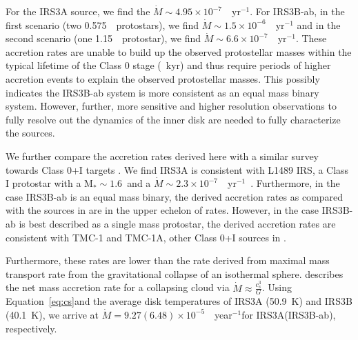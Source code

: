 \documentclass[twocolumn, 12pt, trackchanges]{aastex63}
\begin{document}
For the IRS3A source, we find the $\dot{M}\sim4.95\times10^{-7}$~\solm~yr$^{-1}$. For IRS3B-ab, in the first scenario (two 0.575~\solm~protostars), we find $\dot{M}\sim1.5\times10^{-6}$~\solm~yr$^{-1}$ and in the second scenario (one 1.15~\solm~protostar), we find $\dot{M}\sim6.6\times10^{-7}$~\solm~yr$^{-1}$. These accretion rates are unable to build up the observed protostellar masses within the typical lifetime of the Class 0 stage (~kyr) and thus require periods of higher accretion events to explain the observed protostellar masses. This possibly indicates the IRS3B-ab system is more consistent as an equal mass binary system. However, further, more sensitive and higher resolution observations to fully resolve out the dynamics of the inner disk are needed to fully characterize the sources.

We further compare the accretion rates derived here with a similar survey towards Class 0+I targets \citep{2017ApJ...834..178Y}. We find IRS3A is consistent with L1489 IRS, a Class I protostar with a M$_{*}\sim1.6$~\solm\space\citep[][]{2013ApJ...770..123G}\space and a $\dot{M}\sim2.3\times10^{-7}$~\solm~yr$^{-1}$~\citep[][]{2014ApJ...793....1Y}. Furthermore, in the case IRS3B-ab is an equal mass binary, the derived accretion rates as compared with the sources in \citet{2017ApJ...834..178Y}\space are in the upper echelon of rates. However, in the case IRS3B-ab is best described as a single mass protostar, the derived accretion rates are consistent with TMC-1 and TMC-1A, other Class 0+I sources in \citet{2017ApJ...834..178Y}.

Furthermore, these rates are lower than the rate derived from maximal mass transport rate from the gravitational collapse of an isothermal sphere. \citet{1994ApJ...431..341S}\space describes the net mass accretion rate for a collapsing cloud via $\dot{M} \approx \frac{c_{s}^{3}}{G}$. Using Equation~\ref{eq:cs}\space and the average disk temperatures of IRS3A (50.9~K) and IRS3B (40.1~K), we arrive at $\dot{M} = 9.27(6.48)\times10^{-5}$~\solm~year$^{-1}$\space for IRS3A(IRS3B-ab), respectively. 


\end{document}
